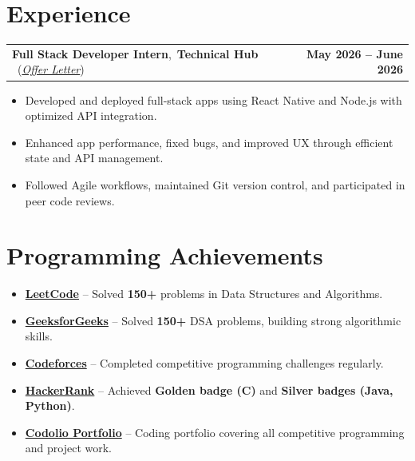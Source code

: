 \documentclass[9.5pt, letterpaper]{article}
\makeatletter
\newcommand{\dateright}[2]{%
  \begin{tabularx}{\linewidth}{@{}X r@{}}
    #1 & \textbf{\small #2}
  \end{tabularx}}
\makeatother
\begin{document}
\vspace{2pt}

\section{Experience}

\dateright{%
  \textbf{Full Stack Developer Intern},~\textbf{Technical Hub}
  ~\textnormal{(\href{https://drive.google.com/file/d/1g7crCvVdDMeZgIonjfO84YQrIZWaGruN/view?usp=sharing}{\textit{Offer Letter}})}%
}{May 2026 -- June 2026}
\begin{itemize}
  \item Developed and deployed full-stack apps using React Native and Node.js with optimized API integration.
  \item Enhanced app performance, fixed bugs, and improved UX through efficient state and API management.
  \item Followed Agile workflows, maintained Git version control, and participated in peer code reviews.
\end{itemize}

\vspace{2pt}

\section{Programming Achievements}
\begin{itemize}
  \item \href{https://leetcode.com/u/prasannayadav/}{\textbf{LeetCode}} --
        Solved \textbf{150+} problems in Data Structures and Algorithms.
  \item \href{https://www.geeksforgeeks.org/profile/prasannay8d9p}{\textbf{GeeksforGeeks}} --
        Solved \textbf{150+} DSA problems, building strong algorithmic skills.
  \item \href{https://codeforces.com/profile/prasannayadav}{\textbf{Codeforces}} --
        Completed competitive programming challenges regularly.
  \item \href{https://www.hackerrank.com/profile/prasannayadav241}{\textbf{HackerRank}} --
        Achieved \textbf{Golden badge (C)} and \textbf{Silver badges (Java, Python)}.
  \item \href{https://codolio.com/profile/prasanna_yadav}{\textbf{Codolio Portfolio}} --
        Coding portfolio covering all competitive programming and project work.
\end{itemize}
\end{document}
